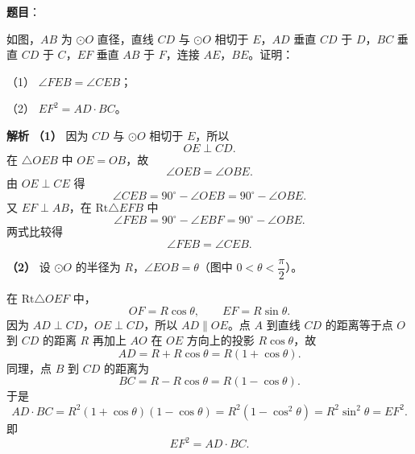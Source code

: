 \begin{answer}

\textbf{题目}：

如图，$AB$ 为 $\odot O$ 直径，直线 $CD$ 与 $\odot O$ 相切于 $E$，$AD$ 垂直 $CD$ 于 $D$，$BC$ 垂直 $CD$ 于 $C$，$EF$ 垂直 $AB$ 于 $F$，连接 $AE$，$BE$。证明：

（1） $\angle FEB=\angle CEB$；

（2） $EF^2=AD\cdot BC$。
\nopagebreak[4]
\begin{center}\end{center}
\nopagebreak[4]
\textbf{解析}
\textbf{（1）} 因为 $CD$ 与 $\odot O$ 相切于 $E$，所以
\nopagebreak[4]
\[OE\perp CD.\]
在 $\triangle OEB$ 中 $OE=OB$，故
\nopagebreak[4]
\[\angle OEB=\angle OBE.\]
由 $OE\perp CE$ 得
\nopagebreak[4]
\[\angle CEB=90^\circ-\angle OEB=90^\circ-\angle OBE.\]
又 $EF\perp AB$，在 $\mathrm{Rt}\triangle EFB$ 中
\nopagebreak[4]
\[\angle FEB=90^\circ-\angle EBF=90^\circ-\angle OBE.\]
两式比较得
\nopagebreak[4]
\[\angle FEB=\angle CEB.\]

\textbf{（2）} 设 $\odot O$ 的半径为 $R$，$\angle EOB=\theta$（图中 $0<\theta<\dfrac\pi2$）。

在 $\mathrm{Rt}\triangle OEF$ 中，
\nopagebreak[4]
\[OF=R\cos\theta,\qquad EF=R\sin\theta.\]
因为 $AD\perp CD$，$OE\perp CD$，所以 $AD\parallel OE$。点 $A$ 到直线 $CD$ 的距离等于点 $O$ 到 $CD$ 的距离 $R$ 再加上 $AO$ 在 $OE$ 方向上的投影 $R\cos\theta$，故
\nopagebreak[4]
\[AD=R+R\cos\theta=R(1+\cos\theta).\]
同理，点 $B$ 到 $CD$ 的距离为
\nopagebreak[4]
\[BC=R-R\cos\theta=R(1-\cos\theta).\]
于是
\nopagebreak[4]
\[AD\cdot BC=R^2(1+\cos\theta)(1-\cos\theta)=R^2\left(1-\cos^2\theta\right)=R^2\sin^2\theta=EF^2.\]
即
\nopagebreak[4]
\[EF^2=AD\cdot BC.\]



\end{answer}
